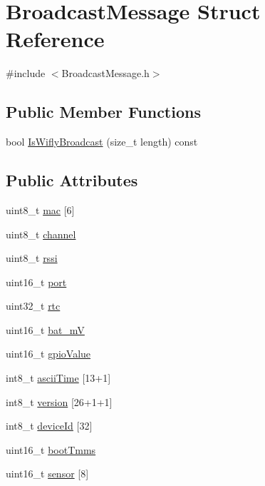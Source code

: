 \hypertarget{struct_broadcast_message}{\section{Broadcast\-Message Struct Reference}
\label{struct_broadcast_message}
}


{\ttfamily \#include $<$Broadcast\-Message.\-h$>$}

\subsection*{Public Member Functions}
\begin{DoxyCompactItemize}
\item 
bool \hyperlink{struct_broadcast_message_a3050a0c141e0bd6d5333f9c7d880842c}{Is\-Wifly\-Broadcast} (size\-\_\-t length) const 
\end{DoxyCompactItemize}
\subsection*{Public Attributes}
\begin{DoxyCompactItemize}
\item 
uint8\-\_\-t \hyperlink{struct_broadcast_message_a3ac273d4896e7a2f61bc9e5e462b7f12}{mac} \mbox{[}6\mbox{]}
\item 
uint8\-\_\-t \hyperlink{struct_broadcast_message_a2a8000548cf6f0765d8d5a95346819e3}{channel}
\item 
uint8\-\_\-t \hyperlink{struct_broadcast_message_ad01e36acd26ba12f61cf46f116173680}{rssi}
\item 
uint16\-\_\-t \hyperlink{struct_broadcast_message_ad1b068a0ec74e5ffdb2dd0d4ab550616}{port}
\item 
uint32\-\_\-t \hyperlink{struct_broadcast_message_ab7f823fa16241b8305ce51a808d534ce}{rtc}
\item 
uint16\-\_\-t \hyperlink{struct_broadcast_message_ad4ba25279648f3d69685a59b139c9abe}{bat\-\_\-m\-V}
\item 
uint16\-\_\-t \hyperlink{struct_broadcast_message_a70f920e51357cadc8b8289726cfaf9a6}{gpio\-Value}
\item 
int8\-\_\-t \hyperlink{struct_broadcast_message_aa7f6b47ac086067f235f7bf50a1ba463}{ascii\-Time} \mbox{[}13+1\mbox{]}
\item 
int8\-\_\-t \hyperlink{struct_broadcast_message_ac348f0fde101e0d4ecb2ea47de28b8dc}{version} \mbox{[}26+1+1\mbox{]}
\item 
int8\-\_\-t \hyperlink{struct_broadcast_message_a5eed77683f928d1454419138eed7d673}{device\-Id} \mbox{[}32\mbox{]}
\item 
uint16\-\_\-t \hyperlink{struct_broadcast_message_a20abccb0a47e7956cd2a3bcd3299c23c}{boot\-Tmms}
\item 
uint16\-\_\-t \hyperlink{struct_broadcast_message_adfe11beb5dc63400e112cfe2bf59fd0b}{sensor} \mbox{[}8\mbox{]}
\end{DoxyCompactItemize}


